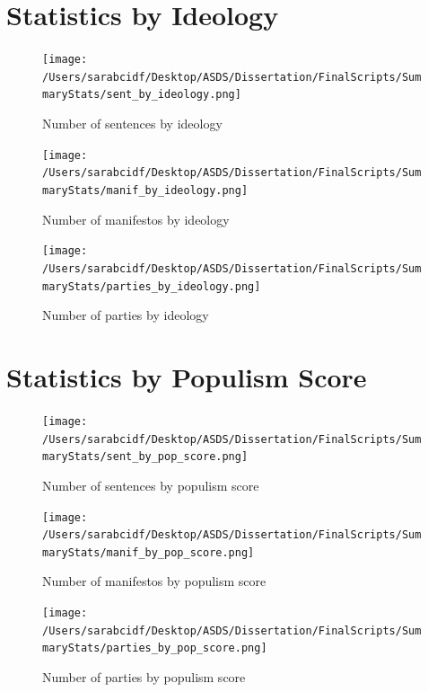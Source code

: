 \documentclass[12pt,letterpaper]{article}
\begin{document}
	\section{Statistics by Ideology}
	
		\begin{figure}[H]
		\centering
		\caption{Number of sentences by ideology}
		\label{fig:yourfigure}
		\texttt{[image: /Users/sarabcidf/Desktop/ASDS/Dissertation/FinalScripts/SummaryStats/sent\_by\_ideology.png]} 
	\end{figure}
	
	\begin{figure}[H]
		\centering
		\caption{Number of manifestos by ideology}
		\label{fig:yourfigure}
		\texttt{[image: /Users/sarabcidf/Desktop/ASDS/Dissertation/FinalScripts/SummaryStats/manif\_by\_ideology.png]} 
	\end{figure}
	
	\begin{figure}[H]
		\centering
		\caption{Number of parties by ideology}
		\label{fig:yourfigure}
		\texttt{[image: /Users/sarabcidf/Desktop/ASDS/Dissertation/FinalScripts/SummaryStats/parties\_by\_ideology.png]} 
	\end{figure}
	
	\section{Statistics by Populism Score}
	
			\begin{figure}[H]
		\centering
		\caption{Number of sentences by populism score}
		\label{fig:yourfigure}
		\texttt{[image: /Users/sarabcidf/Desktop/ASDS/Dissertation/FinalScripts/SummaryStats/sent\_by\_pop\_score.png]} 
	\end{figure}
	
	\begin{figure}[H]
		\centering
		\caption{Number of manifestos by populism score}
		\label{fig:yourfigure}
		\texttt{[image: /Users/sarabcidf/Desktop/ASDS/Dissertation/FinalScripts/SummaryStats/manif\_by\_pop\_score.png]} 
	\end{figure}
	
	\begin{figure}[H]
		\centering
		\caption{Number of parties by populism score}
		\label{fig:yourfigure}
		\texttt{[image: /Users/sarabcidf/Desktop/ASDS/Dissertation/FinalScripts/SummaryStats/parties\_by\_pop\_score.png]} 
	\end{figure}
	
\end{document}
